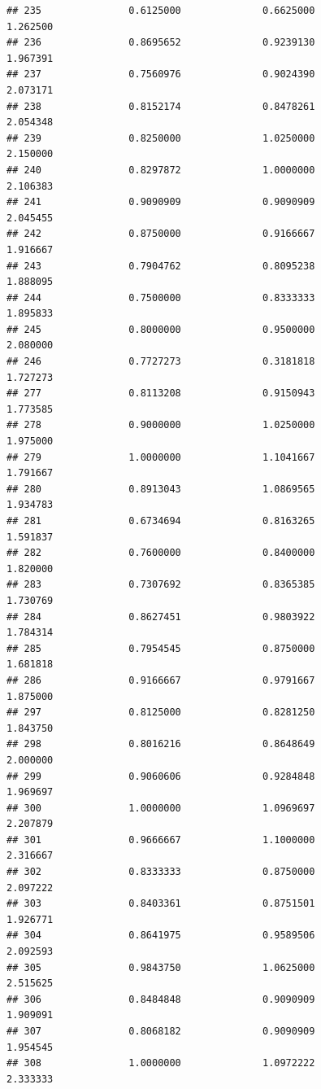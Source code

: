 \documentclass[]{article}
\begin{document}
\begin{verbatim}
## 235               0.6125000              0.6625000               1.262500
## 236               0.8695652              0.9239130               1.967391
## 237               0.7560976              0.9024390               2.073171
## 238               0.8152174              0.8478261               2.054348
## 239               0.8250000              1.0250000               2.150000
## 240               0.8297872              1.0000000               2.106383
## 241               0.9090909              0.9090909               2.045455
## 242               0.8750000              0.9166667               1.916667
## 243               0.7904762              0.8095238               1.888095
## 244               0.7500000              0.8333333               1.895833
## 245               0.8000000              0.9500000               2.080000
## 246               0.7727273              0.3181818               1.727273
## 277               0.8113208              0.9150943               1.773585
## 278               0.9000000              1.0250000               1.975000
## 279               1.0000000              1.1041667               1.791667
## 280               0.8913043              1.0869565               1.934783
## 281               0.6734694              0.8163265               1.591837
## 282               0.7600000              0.8400000               1.820000
## 283               0.7307692              0.8365385               1.730769
## 284               0.8627451              0.9803922               1.784314
## 285               0.7954545              0.8750000               1.681818
## 286               0.9166667              0.9791667               1.875000
## 297               0.8125000              0.8281250               1.843750
## 298               0.8016216              0.8648649               2.000000
## 299               0.9060606              0.9284848               1.969697
## 300               1.0000000              1.0969697               2.207879
## 301               0.9666667              1.1000000               2.316667
## 302               0.8333333              0.8750000               2.097222
## 303               0.8403361              0.8751501               1.926771
## 304               0.8641975              0.9589506               2.092593
## 305               0.9843750              1.0625000               2.515625
## 306               0.8484848              0.9090909               1.909091
## 307               0.8068182              0.9090909               1.954545
## 308               1.0000000              1.0972222               2.333333

\end{verbatim}
\end{document}
